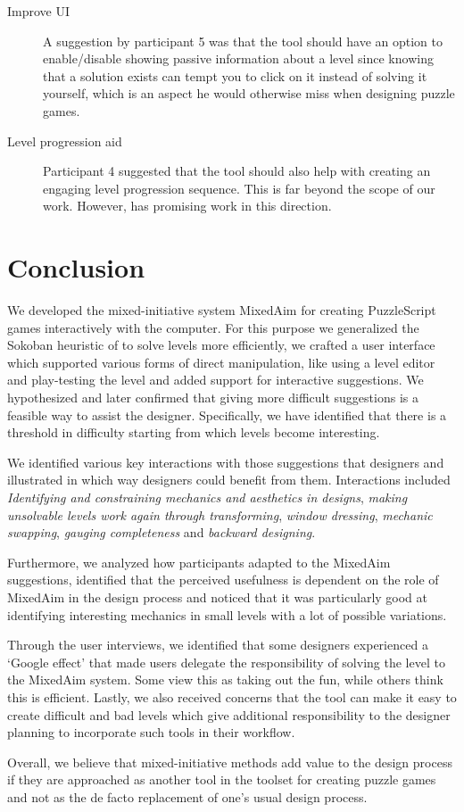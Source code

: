 \begin{description}
    \item[Improve UI] A suggestion by participant 5 was that the tool should have an option to enable/disable showing passive information about a level since knowing that a solution exists can tempt you to click on it instead of solving it yourself, which is an aspect he would otherwise miss when designing puzzle games.
     
     \item[Level progression aid] Participant 4 suggested that the tool should also help with creating an engaging level progression sequence. This is far beyond the scope of our work. However, \cite{Butler2013} has promising work in this direction. 
    
\end{description}

\section{Conclusion}

We developed the mixed-initiative system MixedAim for creating PuzzleScript games interactively with the computer. For this purpose we generalized the Sokoban heuristic of \cite{Junghanns1999} to solve levels more efficiently, we crafted a user interface which supported various forms of direct manipulation, like using a level editor and play-testing the level and added support for interactive suggestions. We hypothesized and later confirmed that giving more difficult suggestions is a feasible way to assist the designer. Specifically, we have identified that there is a threshold in difficulty starting from which levels become interesting.

We identified various key interactions with those suggestions that designers and illustrated in which way designers could benefit from them. Interactions included \textit{Identifying and constraining mechanics and aesthetics in designs}, \textit{making unsolvable levels work again through transforming},  \textit{window dressing}, \textit{mechanic swapping}, \textit{gauging completeness} and \textit{backward designing}.

Furthermore, we analyzed how participants adapted to the MixedAim suggestions, identified that the perceived usefulness is dependent on the role of MixedAim in the design process and noticed that it was particularly good at identifying interesting mechanics in small levels with a lot of possible variations.

Through the user interviews, we identified that some designers experienced a `Google effect' that made users delegate the responsibility of solving the level to the MixedAim system. Some view this as taking out the fun, while others think this is efficient. Lastly, we also received concerns that the tool can make it easy to create difficult and bad levels which give additional responsibility to the designer planning to incorporate such tools in their workflow.

Overall, we believe that mixed-initiative methods add value to the design process if they are approached as another tool in the toolset for creating puzzle games and not as the de facto replacement of one's usual design process.
